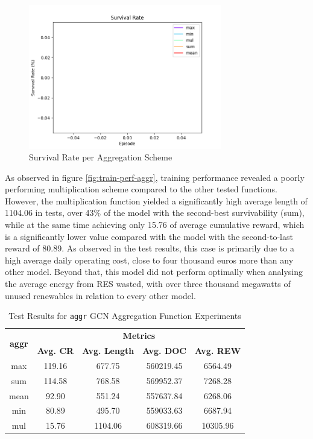 \begin{figure}[ht]
	\includegraphics[width=0.75\textwidth]{graphs/aggr/survival_rate.png}
	\caption{Survival Rate per Aggregation Scheme}
	\label{fig:train-surv-aggr}
\end{figure}

As observed in figure \ref{fig:train-perf-aggr}, training performance revealed a poorly performing multiplication scheme compared to the other tested functions. However, the multiplication function yielded a significantly high average length of 1104.06 in tests, over 43\% of the model with the second-best survivability (sum), while at the same time achieving only 15.76 of average cumulative reward, which is a significantly lower value compared with the model with the second-to-last reward of 80.89. As observed in the test results, this case is primarily due to a high average daily operating cost, close to four thousand euros more than any other model. Beyond that, this model did not perform optimally when analysing the average energy from \ac{RES} wasted, with over three thousand megawatts of unused renewables in relation to every other model. \par

\begin{table}[h!]
	\centering
	\caption{Test Results for \texttt{aggr} \ac{GCN} Aggregation Function Experiments}
	\begin{tabular}{ccccc}
		\toprule
		\multirow{2}{*}{\textbf{aggr}} & \multicolumn{4}{c}{\textbf{Metrics}} \\ 
		\cmidrule(lr){2-5}
		&  \textbf{Avg. CR} & \textbf{Avg. Length} & \textbf{Avg. DOC} & \textbf{Avg. REW} \\ 
		\midrule
		max & 119.16 & 677.75 & 560219.45 & 6564.49 \\
		sum & 114.58 & 768.58 & 569952.37 & 7268.28 \\
		mean & 92.90 &  551.24 & 557637.84 & 6268.06 \\
		min & 80.89 & 495.70 & 559033.63 & 6687.94 \\
		mul & 15.76 & 1104.06 & 608319.66 & 10305.96 \\
		\bottomrule
	\end{tabular}
	\label{tab:test-gcn-aggr}
\end{table}


